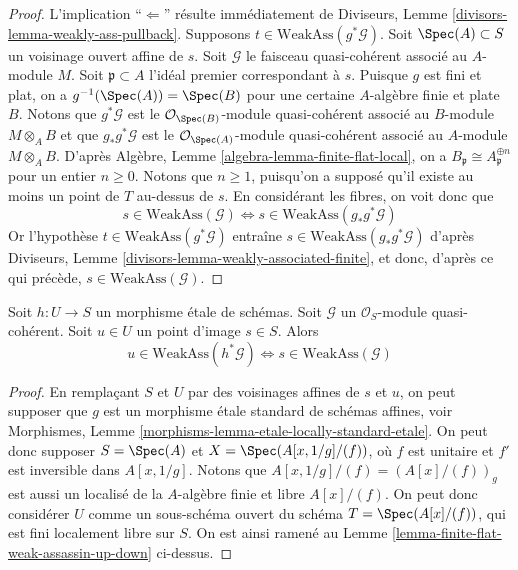 \begin{proof}
L'implication ``$\Leftarrow$'' résulte immédiatement de
Diviseurs, Lemme \ref{divisors-lemma-weakly-ass-pullback}.
Supposons $t \in \text{WeakAss}(g^*\mathcal{G})$.
Soit $\Spec(A) \subset S$ un voisinage ouvert affine de $s$.
Soit $\mathcal{G}$ le faisceau quasi-cohérent associé au $A$-module $M$.
Soit $\mathfrak p \subset A$ l'idéal premier correspondant à $s$.
Puisque $g$ est fini et plat, on a $g^{-1}(\Spec(A)) = \Spec(B)$
pour une certaine $A$-algèbre finie et plate $B$. Notons que
$g^*\mathcal{G}$ est le $\mathcal{O}_{\Spec(B)}$-module quasi-cohérent
associé au $B$-module $M \otimes_A B$ et que $g_*g^*\mathcal{G}$ est le
$\mathcal{O}_{\Spec(A)}$-module quasi-cohérent associé au
$A$-module $M \otimes_A B$. D'après
Algèbre, Lemme \ref{algebra-lemma-finite-flat-local},
on a $B_{\mathfrak p} \cong A_{\mathfrak p}^{\oplus n}$
pour un entier $n \geq 0$. Notons que $n \geq 1$, puisqu'on a supposé qu'il
existe au moins un point de $T$ au-dessus de $s$. En considérant
les fibres, on voit donc que
$$
s \in \text{WeakAss}(\mathcal{G})
\Leftrightarrow
s \in \text{WeakAss}(g_*g^*\mathcal{G})
$$
Or l'hypothèse $t \in \text{WeakAss}(g^*\mathcal{G})$
entraîne $s \in \text{WeakAss}(g_*g^*\mathcal{G})$ d'après
Diviseurs, Lemme \ref{divisors-lemma-weakly-associated-finite},
et donc, d'après ce qui précède, $s \in  \text{WeakAss}(\mathcal{G})$.
\end{proof}

\begin{lemma}
\label{lemma-etale-weak-assassin-up-down}
Soit $h : U \to S$ un morphisme \'etale de schémas.
Soit $\mathcal{G}$ un $\mathcal{O}_S$-module quasi-cohérent.
Soit $u \in U$ un point d'image $s \in S$. Alors
$$
u \in \text{WeakAss}(h^*\mathcal{G})
\Leftrightarrow
s \in \text{WeakAss}(\mathcal{G})
$$
\end{lemma}

\begin{proof}
En remplaçant $S$ et $U$ par des voisinages affines de $s$ et $u$,
on peut supposer que $g$ est un morphisme \'etale standard de schémas affines, voir
Morphismes, Lemme \ref{morphisms-lemma-etale-locally-standard-etale}.
On peut donc supposer $S = \Spec(A)$ et\newline
$X = \Spec(A[x, 1/g]/(f))$, où $f$ est unitaire et $f'$
est inversible dans $A[x, 1/g]$.
Notons que $A[x, 1/g]/(f) = (A[x]/(f))_g$ est aussi un localisé
de la $A$-algèbre finie et libre $A[x]/(f)$. On peut donc considérer
$U$ comme un sous-schéma ouvert du schéma $T = \Spec(A[x]/(f))$,
qui est fini localement libre sur $S$. On est ainsi ramené au
Lemme \ref{lemma-finite-flat-weak-assassin-up-down}
ci-dessus.
\end{proof}

